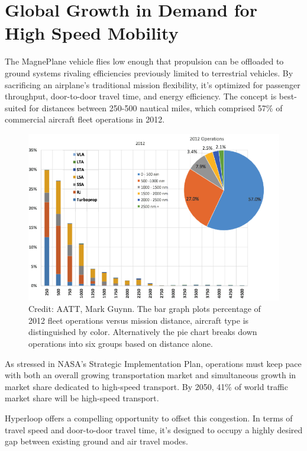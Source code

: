 \documentclass[heading.tex]{subfiles}
\begin{document}
\section{Global Growth in Demand for High Speed Mobility}
	\label{s:demand}

	The MagnePlane vehicle flies low enough that propulsion can be offloaded to
	ground systems rivaling efficiencies previously limited to terrestrial
	vehicles. By sacrificing an airplane’s traditional mission flexibility,
	it’s optimized for passenger throughput, door-to-door travel time, and energy
	efficiency.
	The concept is best-suited for distances between 250-500 nautical miles,
	which comprised 57\% of commercial aircraft fleet operations in 2012.

	\begin{figure}[H]
		\centering
		\includegraphics[width=.75\textwidth]{images/Pie.png}
		\caption[FleetOps]{Credit: AATT, Mark Guynn. The bar graph plots percentage of 2012 fleet operations versus mission distance, aircraft type is distinguished by color. Alternatively the pie chart breaks down operations into six groups based on distance alone.}
		\label{f:fleetOps}
	\end{figure}

	As stressed in NASA's Strategic Implementation Plan, operations must keep pace
	with both an overall growing transportation market and simultaneous growth in
	market share dedicated to high-speed transport. By 2050, 41\% of world traffic
	market share will be high-speed transport. \cite{Schafer}

	Hyperloop offers a compelling opportunity to offset this congestion. In terms of travel speed and door-to-door travel time, it's designed to occupy a highly desired gap between existing ground and air travel modes.
\end{document}
